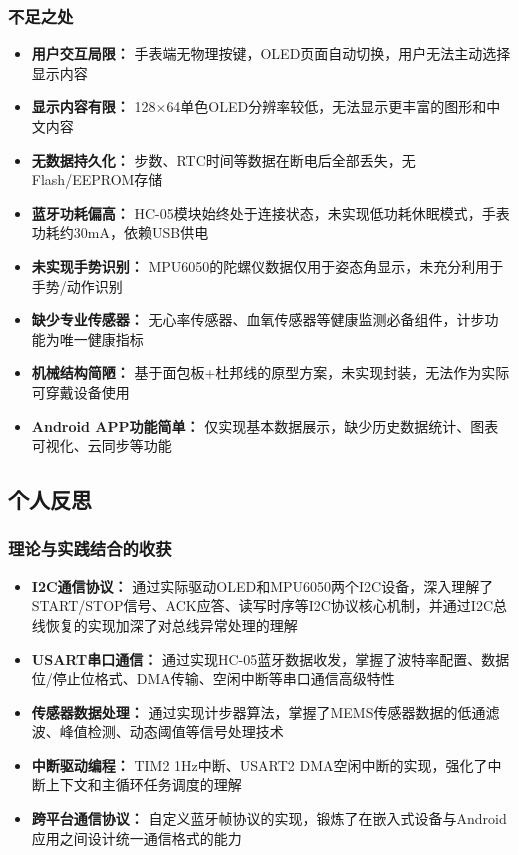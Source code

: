\subsubsection{不足之处}
\begin{itemize}
    \item \textbf{用户交互局限：} 手表端无物理按键，OLED页面自动切换，用户无法主动选择显示内容
    \item \textbf{显示内容有限：} 128$\times$64单色OLED分辨率较低，无法显示更丰富的图形和中文内容
    \item \textbf{无数据持久化：} 步数、RTC时间等数据在断电后全部丢失，无Flash/EEPROM存储
    \item \textbf{蓝牙功耗偏高：} HC-05模块始终处于连接状态，未实现低功耗休眠模式，手表功耗约30mA，依赖USB供电
    \item \textbf{未实现手势识别：} MPU6050的陀螺仪数据仅用于姿态角显示，未充分利用于手势/动作识别
    \item \textbf{缺少专业传感器：} 无心率传感器、血氧传感器等健康监测必备组件，计步功能为唯一健康指标
    \item \textbf{机械结构简陋：} 基于面包板+杜邦线的原型方案，未实现封装，无法作为实际可穿戴设备使用
    \item \textbf{Android APP功能简单：} 仅实现基本数据展示，缺少历史数据统计、图表可视化、云同步等功能
\end{itemize}

\subsection{个人反思}

\subsubsection{理论与实践结合的收获}
\begin{itemize}
    \item \textbf{I2C通信协议：} 通过实际驱动OLED和MPU6050两个I2C设备，深入理解了START/STOP信号、ACK应答、读写时序等I2C协议核心机制，并通过I2C总线恢复的实现加深了对总线异常处理的理解
    \item \textbf{USART串口通信：} 通过实现HC-05蓝牙数据收发，掌握了波特率配置、数据位/停止位格式、DMA传输、空闲中断等串口通信高级特性
    \item \textbf{传感器数据处理：} 通过实现计步器算法，掌握了MEMS传感器数据的低通滤波、峰值检测、动态阈值等信号处理技术
    \item \textbf{中断驱动编程：} TIM2 1Hz中断、USART2 DMA空闲中断的实现，强化了中断上下文和主循环任务调度的理解
    \item \textbf{跨平台通信协议：} 自定义蓝牙帧协议的实现，锻炼了在嵌入式设备与Android应用之间设计统一通信格式的能力
\end{itemize}

